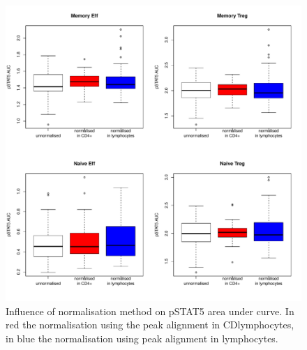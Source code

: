 \begin{figure}[h]
    \centering
    \includegraphics[scale=.5]{IL2/figures/pstat5-auc-boxplots-celltypes.pdf}
    { Influence of normalisation method on pSTAT5 area under curve. }
    { In red the normalisation using the peak alignment in CD\positive lymphocytes, in blue the normalisation using peak alignment in lymphocytes. }
\end{figure} 
